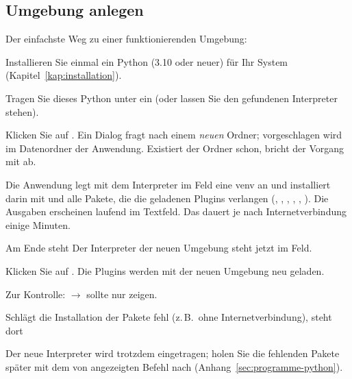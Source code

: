 \subsection{Umgebung anlegen}\label{sec:umgebung-anlegen}

Der einfachste Weg zu einer funktionierenden Umgebung:

\begin{schritte}
  \item Installieren Sie einmal ein Python (3.10 oder neuer) für Ihr System
        (Kapitel~\ref{kap:installation}).
  \item Tragen Sie dieses Python unter  ein (oder lassen Sie den
        gefundenen Interpreter stehen).
  \item Klicken Sie auf . Ein Dialog  fragt nach einem \emph{neuen} Ordner; vorgeschlagen wird
         im Datenordner der Anwendung. Existiert der Ordner schon, bricht der
        Vorgang mit  ab.
  \item Die Anwendung legt mit dem Interpreter im Feld eine venv an und installiert darin mit
          und alle Pakete, die die geladenen Plugins verlangen
        (, , ,
        , , ). Die Ausgaben erscheinen
        laufend im Textfeld. Das dauert je nach Internetverbindung einige Minuten.
  \item Am Ende steht  Der
        Interpreter der neuen Umgebung steht jetzt im Feld.
  \item Klicken Sie auf . Die Plugins werden mit der neuen Umgebung neu geladen.
  \item Zur Kontrolle:  $\to$  sollte nur
        \checkmark{} zeigen.
\end{schritte}

Schlägt die Installation der Pakete fehl (z.\,B.\ ohne Internetverbindung), steht dort
\begin{quote}\raggedright
{}
\end{quote}
Der neue Interpreter wird trotzdem eingetragen; holen Sie die fehlenden Pakete später mit dem
von  angezeigten Befehl nach (Anhang~\ref{sec:programme-python}).


